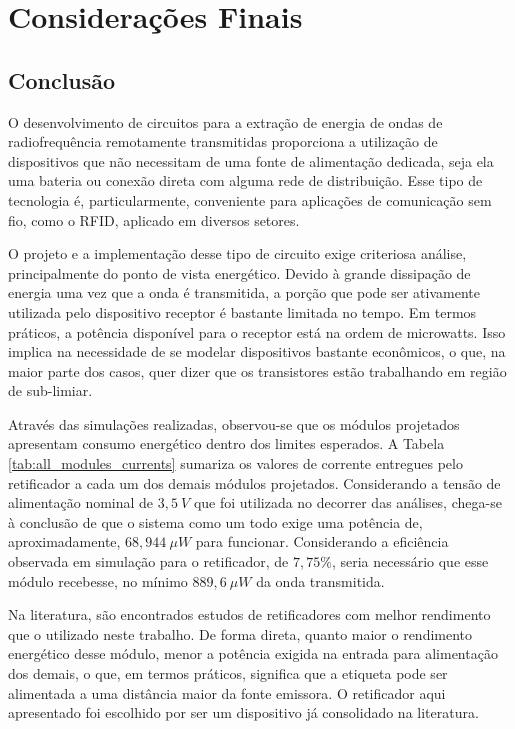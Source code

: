 \chapter{Considerações Finais}\label{Conclusao}

\section{Conclusão}
O desenvolvimento de circuitos para a extração de energia de ondas de radiofrequência remotamente transmitidas proporciona a utilização de dispositivos que não necessitam de uma fonte de alimentação dedicada, seja ela uma bateria ou conexão direta com alguma rede de distribuição. Esse tipo de tecnologia é, particularmente, conveniente para aplicações de comunicação sem fio, como o RFID, aplicado em diversos setores.

O projeto e a implementação desse tipo de circuito exige criteriosa análise, principalmente do ponto de vista energético. Devido à grande dissipação de energia uma vez que a onda é transmitida, a porção que pode ser ativamente utilizada pelo dispositivo receptor é bastante limitada no tempo. Em termos práticos, a potência disponível para o receptor está na ordem de microwatts. Isso implica na necessidade de se modelar dispositivos bastante econômicos, o que, na maior parte dos casos, quer dizer que os transistores estão trabalhando em região de sub-limiar.

Através das simulações realizadas, observou-se que os módulos projetados apresentam consumo energético dentro dos limites esperados. A Tabela \ref{tab:all_modules_currents} sumariza os valores de corrente entregues pelo retificador a cada um dos demais módulos projetados. Considerando a tensão de alimentação nominal de $3,5~V$ que foi utilizada no decorrer das análises, chega-se à conclusão de que o sistema como um todo exige uma potência de, aproximadamente, $68,944~\mu W$ para funcionar. Considerando a eficiência observada em simulação para o retificador, de $7,75\%$, seria necessário que esse módulo recebesse, no mínimo $889,6~\mu W$ da onda transmitida.

Na literatura, são encontrados estudos de retificadores com melhor rendimento que o utilizado neste trabalho. De forma direta, quanto maior o rendimento energético desse módulo, menor a potência exigida na entrada para alimentação dos demais, o que, em termos práticos, significa que a etiqueta pode ser alimentada a uma distância maior da fonte emissora. O retificador aqui apresentado foi escolhido por ser um dispositivo já consolidado na literatura.

